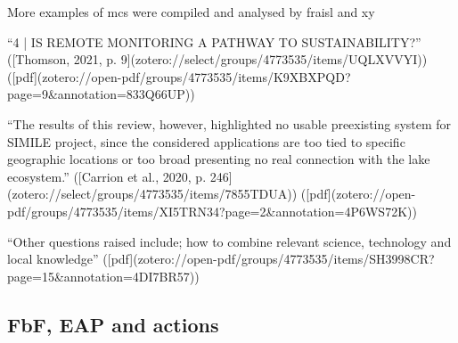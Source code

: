 More examples of \acrshort*{mcs} were compiled and analysed by fraisl and xy




“4 | IS REMOTE MONITORING A PATHWAY TO SUSTAINABILITY?” ([Thomson, 2021, p. 9](zotero://select/groups/4773535/items/UQLXVVYI)) ([pdf](zotero://open-pdf/groups/4773535/items/K9XBXPQD?page=9&annotation=833Q66UP))

“The results of this review, however, highlighted no usable preexisting system for SIMILE project, since the considered applications are too tied to specific geographic locations or too broad presenting no real connection with the lake ecosystem.” ([Carrion et al., 2020, p. 246](zotero://select/groups/4773535/items/7855TDUA)) ([pdf](zotero://open-pdf/groups/4773535/items/XI5TRN34?page=2&annotation=4P6WS72K))

“Other questions raised include; how to combine relevant science, technology and local knowledge” ([pdf](zotero://open-pdf/groups/4773535/items/SH3998CR?page=15&annotation=4DI7BR57))





\subsection{FbF, EAP and actions}

